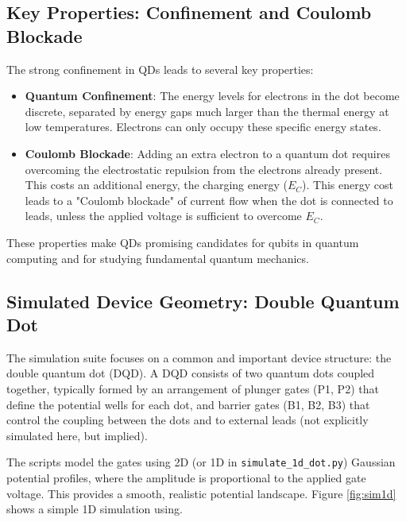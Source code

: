 \documentclass{article}
\begin{document}
\subsection{Key Properties: Confinement and Coulomb Blockade}
The strong confinement in QDs leads to several key properties:
\begin{itemize}
	\item \textbf{Quantum Confinement}: The energy levels for electrons in the dot become discrete, separated by energy gaps much larger than the thermal energy at low temperatures. Electrons can only occupy these specific energy states.
	\item \textbf{Coulomb Blockade}: Adding an extra electron to a quantum dot requires overcoming the electrostatic repulsion from the electrons already present. This costs an additional energy, the charging energy ($E_C$). This energy cost leads to a "Coulomb blockade" of current flow when the dot is connected to leads, unless the applied voltage is sufficient to overcome $E_C$.
\end{itemize}
These properties make QDs promising candidates for qubits in quantum computing and for studying fundamental quantum mechanics.

\subsection{Simulated Device Geometry: Double Quantum Dot}
The simulation suite focuses on a common and important device structure: the double quantum dot (DQD). A DQD consists of two quantum dots coupled together, typically formed by an arrangement of plunger gates (P1, P2) that define the potential wells for each dot, and barrier gates (B1, B2, B3) that control the coupling between the dots and to external leads (not explicitly simulated here, but implied).

The scripts model the gates using 2D (or 1D in \texttt{simulate\_1d\_dot.py}) Gaussian potential profiles, where the amplitude is proportional to the applied gate voltage. This provides a smooth, realistic potential landscape. Figure \ref{fig:sim1d} shows a simple 1D simulation using.
\end{document}
